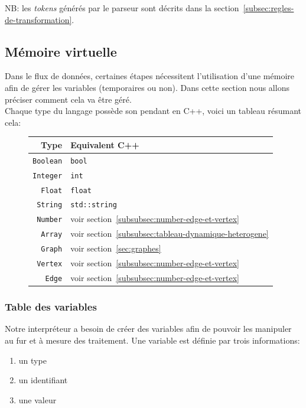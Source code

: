 \documentclass[french]{article}
\begin{document}
		NB: les \textit{tokens} générés par le parseur sont décrits dans la section~\ref{subsec:regles-de-transformation}.
		
		\subsection{Mémoire virtuelle} 
		\label{subsec:memoire-virtuelle}
		Dans le flux de données, certaines étapes nécessitent l'utilisation d'une mémoire afin de gérer les variables (temporaires ou non). Dans cette section nous allons préciser comment cela va être géré.\\
		
		Chaque type du langage possède son pendant en C++, voici un tableau résumant cela:\\
		
		\begin{figure}[H]
			\centering
			\begin{tabular}{r|l}
				Type & Equivalent C++\\ \hline\hline
				\texttt{Boolean} & \texttt{bool}\\
				\texttt{Integer} & \texttt{int}\\
				\texttt{Float} & \texttt{float}\\
				\texttt{String} & \texttt{std::string}\\
				\texttt{Number} & voir section~\ref{subsubsec:number-edge-et-vertex}\\
				\texttt{Array} & voir section~\ref{subsubsec:tableau-dynamique-heterogene}\\
				\texttt{Graph} & voir section~\ref{sec:graphes}\\
				\texttt{Vertex} & voir section~\ref{subsubsec:number-edge-et-vertex}\\
				\texttt{Edge} & voir section~\ref{subsubsec:number-edge-et-vertex}
			\end{tabular}
		\end{figure}
		
		\subsubsection{Table des variables}
		\label{subsubsec:table-des-variables}
		Notre interpréteur a besoin de créer des variables afin de pouvoir les manipuler au fur et à mesure des traitement. Une variable est définie par trois informations:
		
		\begin{enumerate}
			\item un type
			\item un identifiant
			\item une valeur
		\end{enumerate}
		
\end{document}
